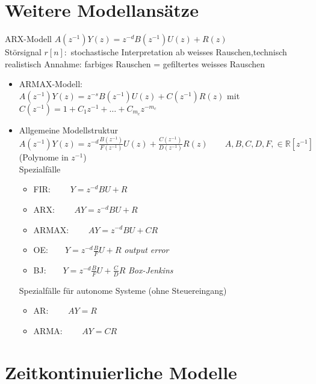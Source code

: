 \documentclass[ngerman]{tudscrreprt}
\begin{document}
\section{Weitere Modellansätze}
ARX-Modell $A(z^{-1})Y(z) = z^{-d}B(z^{-1})U(z) + R(z)$\\
Störsignal $r[n]: $ stochastische Interpretation ab weisses Rauschen,technisch realistisch Annahme: farbiges Rauschen = gefiltertes weisses Rauschen\\
\begin{itemize}
\item ARMAX-Modell: \\$A(z^{-1}) Y(z) = z^{-s}B(z^{-1}) U(z) + C(z^{-1})R(z)$ mit $
C(z^{-1}) = 1 + C_1 z^{-1} + \dots + C_{m_c} z^{-m_c}
$
\item Allgemeine Modellstruktur\\
$A(z^{-1}) Y(z) = z^{-d} \frac{B(z^{-1})}{F(z^{-1})} U(z) + \frac{C(z^{-1})}{D(z^{-1})}R(z)\qquad A,B,C,D,F, \in \mathbb{R}[z^{-1}] $ (Polynome in $z^{-1}$)\\
Spezialfälle
\begin{itemize}
\item FIR: $\qquad Y=z^{-d} BU + R$
\item ARX: $\qquad AY = z^{-d} BU + R$
\item ARMAX: $\qquad AY = z^{-d} BU + CR$
\item OE:$\qquad Y=z^{-d} \frac{B}{F}U + R$ \quad \textit{output error} 
\item BJ:$\qquad Y=z^{-d} \frac{B}{F}U + \frac{C}{D}R$ \quad \textit{Box-Jenkins} 
\end{itemize} 
Spezialfälle für autonome Systeme (ohne Steuereingang)
\begin{itemize}
\item AR: $\qquad AY=R$
\item ARMA: $\qquad AY = CR$
\end{itemize}
\end{itemize}
\section{Zeitkontinuierliche Modelle}
\end{document}
